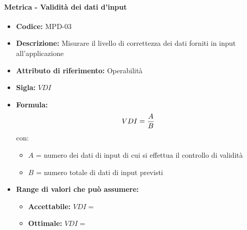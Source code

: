 	 \paragraph{Metrica - Validità dei dati d'input} 
	    \begin{itemize}
          \item  \textbf{Codice: } MPD-03
           \item \textbf{Descrizione:} Misurare il livello di correttezza dei dati forniti in input all'applicazione
         \item   \textbf{Attributo di riferimento:} Operabilità
          \item  \textbf{Sigla:} $VDI$
         \item   \textbf{Formula:} $$VDI = {A \over B}$$
            con:
            \begin{itemize}
                \item $A$ = numero dei dati di input di cui si effettua il controllo di validità 
                \item $B$ = numero totale di dati di input previsti
            \end{itemize}
             
        \item \textbf{Range di valori che può assumere:}
        \begin{itemize}
            \item \textbf{Accettabile:} $VDI = $
            \item \textbf{Ottimale:} $VDI = $
        \end{itemize}
       \end{itemize}
              
                
